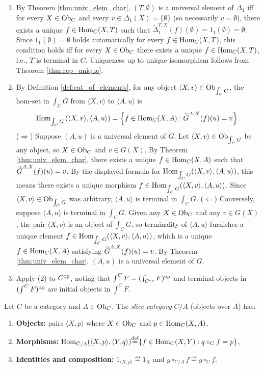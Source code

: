 \documentclass[10pt,a4paper]{article}
\begin{document}
\begin{enumerate}
\item By Theorem \ref{thm:univ_elem_char}, $(T, \emptyset)$ is a universal element of $\Delta_1$ iff for every $X \in {\textrm{Ob}}_C$ and every $v \in \Delta_1(X) = \{\emptyset\}$ (so necessarily $v = \emptyset$), there exists a unique $f \in {\textrm{Hom}}_C(X, T)$ such that $\widetilde{\Delta}_1^{T,X}(f)(\emptyset) = 1_1(\emptyset) = \emptyset$. Since $1_1(\emptyset) = \emptyset$ holds automatically for every $f \in {\textrm{Hom}}_C(X, T)$, this condition holds iff for every $X \in {\textrm{Ob}}_C$ there exists a unique $f \in {\textrm{Hom}}_C(X, T)$, i.e., $T$ is terminal in $C$. Uniqueness up to unique isomorphism follows from Theorem \ref{thm:rep_unique}.
\item By Definition \ref{def:cat_of_elements}, for any object $\langle X, v \rangle \in {\textrm{Ob}}_{\int_C G}$, the hom-set in $\int_C G$ from $\langle X, v \rangle$ to $\langle A, u \rangle$ is
$${\textrm{Hom}}_{\int_C G}\left(\langle X, v \rangle, \langle A, u \rangle\right) = \left\{ f \in {\textrm{Hom}}_C(X, A) : {\widetilde{G}\textrm{}}^{A,X}(f)(u) = v \right\}.$$
($\Longrightarrow$) Suppose $(A, u)$ is a universal element of $G$. Let $\langle X, v \rangle \in {\textrm{Ob}}_{\int_C G}$ be any object, so $X \in {\textrm{Ob}}_C$ and $v \in G(X)$. By Theorem \ref{thm:univ_elem_char}, there exists a unique $f \in {\textrm{Hom}}_C(X, A)$ such that ${\widetilde{G}\textrm{}}^{A,X}(f)(u) = v$. By the displayed formula for ${\textrm{Hom}}_{\int_C G}(\langle X, v \rangle, \langle A, u \rangle)$, this means there exists a unique morphism $f \in {\textrm{Hom}}_{\int_C G}(\langle X, v \rangle, \langle A, u \rangle)$. Since $\langle X, v \rangle \in {\textrm{Ob}}_{\int_C G}$ was arbitrary, $\langle A, u \rangle$ is terminal in $\int_C G$.
($\Longleftarrow$) Conversely, suppose $\langle A, u \rangle$ is terminal in $\int_C G$. Given any $X \in {\textrm{Ob}}_C$ and any $v \in G(X)$, the pair $\langle X, v \rangle$ is an object of $\int_C G$, so terminality of $\langle A, u \rangle$ furnishes a unique element $f \in {\textrm{Hom}}_{\int_C G}(\langle X, v \rangle, \langle A, u \rangle)$, which is a unique $f \in {\textrm{Hom}}_C(X, A)$ satisfying ${\widetilde{G}\textrm{}}^{A,X}(f)(u) = v$. By Theorem \ref{thm:univ_elem_char}, $(A, u)$ is a universal element of $G$.
\item Apply (2) to $C^{\textrm{op}}$, noting that $\int^C F = (\int_{C^{\textrm{op}}} F)^{\textrm{op}}$ and terminal objects in $(\int^C F)^{\textrm{op}}$ are initial objects in $\int^C F$.
\end{enumerate}
\myqed

\begin{definition}\label{def:slice_cat}
Let $C$ be a category and $A \in {\textrm{Ob}}_C$. The \emph{slice category} $C / A$ (objects over $A$) has:
\begin{enumerate}
\item \textbf{Objects:} pairs $\langle X, p \rangle$ where $X \in {\textrm{Ob}}_C$ and $p \in {\textrm{Hom}}_C(X, A)$,
\item \textbf{Morphisms:} ${\textrm{Hom}}_{C/A}(\langle X, p \rangle, \langle Y, q \rangle) {\stackrel{{\textrm{def}}}{=}} \{ f \in {\textrm{Hom}}_C(X, Y) : q \circ_C f = p \}$,
\item \textbf{Identities and composition:} $1_{\langle X, p \rangle} \eqdef 1_X$ and $g \circ_{C/A} f \eqdef g \circ_C f$.
\end{enumerate}
\end{definition}
\end{document}

